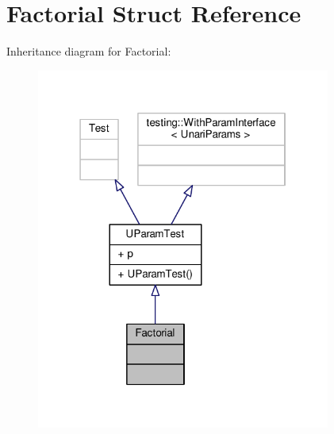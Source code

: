 \hypertarget{struct_factorial}{}\section{Factorial Struct Reference}
\label{struct_factorial}


Inheritance diagram for Factorial\+:
\nopagebreak
\begin{figure}[H]
\begin{center}
\leavevmode
\includegraphics[width=274pt]{struct_factorial__inherit__graph}
\end{center}
\end{figure}


